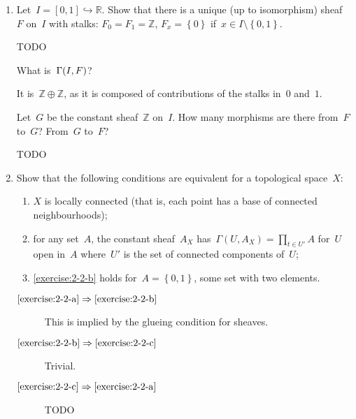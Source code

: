 \documentclass[a4paper,11pt,oneside,openany,article]{memoir}
\begin{document}
\begin{enumerate}
  \item Let~$I=[0,1]\hookrightarrow\mathbb{R}$. Show that there is a unique (up to isomorphism) sheaf~$F$ on~$I$ with stalks: $F_0=F_1=\mathbb{Z}$, $F_x=\left\{ 0 \right\}$ if~$x\in I\setminus\left\{ 0,1 \right\}$.

    \begin{solution}
      TODO
    \end{solution}

    What is~$\mathrm{\Gamma}(I, F)$?

    \begin{solution}
      It is~$\mathbb{Z}\oplus\mathbb{Z}$, as it is composed of contributions of the stalks in~$0$ and~$1$.
    \end{solution}

    Let~$G$ be the constant sheaf~$\mathbb{Z}$ on~$I$. How many morphisms are there from~$F$ to~$G$? From~$G$ to~$F$?

    \begin{solution}
      TODO
    \end{solution}

  \item Show that the following conditions are equivalent for a topological space~$X$:
    \begin{enumerate}
      \item\label{exercise:2-2-a} $X$ is locally connected (that is, each point has a base of connected neighbourhoods);
      \item\label{exercise:2-2-b} for any set~$A$, the constant sheaf~$A_X$ has~$\Gamma(U,A_X)=\prod_{t\in U'}A$ for~$U$ open in~$A$ where~$U'$ is the set of connected components of~$U$;
      \item\label{exercise:2-2-c} \ref{exercise:2-2-b} holds for~$A=\left\{ 0,1 \right\}$, some set with two elements.
    \end{enumerate}

    \begin{solution}
      \begin{description}
        \item[$\ref{exercise:2-2-a}\Rightarrow\ref{exercise:2-2-b}$] This is implied by the glueing condition for sheaves.
        \item[$\ref{exercise:2-2-b}\Rightarrow\ref{exercise:2-2-c}$] Trivial.
        \item[$\ref{exercise:2-2-c}\Rightarrow\ref{exercise:2-2-a}$] TODO
      \end{description}
    \end{solution}


\end{enumerate}
\end{document}

